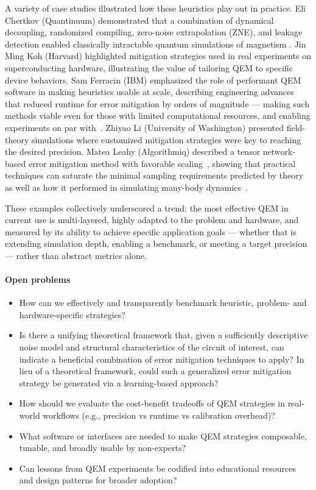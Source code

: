 \documentclass{article}
\begin{document}
A variety of case studies illustrated how these heuristics play out in practice.
Eli Chertkov (Quantinuum) demonstrated that a combination of dynamical decoupling, randomized compiling, zero-noise extrapolation (ZNE), and leakage detection enabled classically intractable quantum simulations of magnetism \cite{chertkov2025}.
Jin Ming Koh (Harvard) highlighted mitigation strategies used in real experiments on superconducting hardware, illustrating the value of tailoring QEM to specific device behaviors.
Sam Ferracin (IBM) emphasized the role of performant QEM software in making heuristics usable at scale, describing engineering advances that reduced runtime for error mitigation by orders of magnitude --- making such methods viable even for those with limited computational resources, and enabling experiments on par with~\cite{IBM-utility}.
Zhiyao Li (University of Washington) presented field-theory simulations where customized mitigation strategies were key to reaching the desired precision. 
Matea Leahy (Algorithmiq) described a tensor network-based error mitigation method with favorable scaling~\cite{filippov2023scalabletensornetworkerrormitigation}, showing that practical techniques can saturate the minimal sampling requirements predicted by theory as well as how it performed in simulating many-body dynamics~\cite{leahy2024}.

These examples collectively underscored a trend: the most effective QEM in current use is multi-layered, highly adapted to the problem and hardware, and measured by its ability to achieve specific application goals --- whether that is extending simulation depth, enabling a benchmark, or meeting a target precision --- rather than abstract metrics alone.

\paragraph{Open problems}
\begin{itemize}
    \item How can we effectively and transparently benchmark heuristic, problem- and hardware-specific strategies?
    \item Is there a unifying theoretical framework that, given a sufficiently descriptive noise model and structural characteristics of the circuit of interest, can indicate a beneficial combination of error mitigation techniques to apply? In lieu of a theoretical framework, could such a generalized error mitigation strategy be generated via a learning-based approach?
    \item How should we evaluate the cost-benefit tradeoffs of QEM strategies in real-world workflows (e.g., precision vs runtime vs calibration overhead)?
    \item What software or interfaces are needed to make QEM strategies composable, tunable, and broadly usable by non-experts?
    \item Can lessons from QEM experiments be codified into educational resources and design patterns for broader adoption?
\end{itemize}
\end{document}
